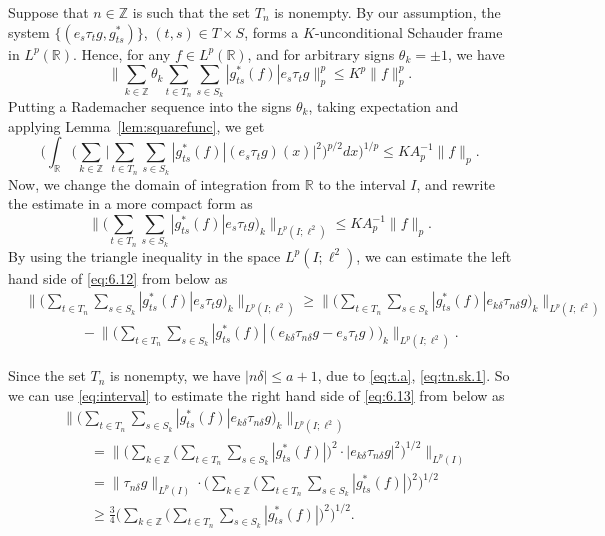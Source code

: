 \documentclass[reqno,a4paper,12pt]{amsart}
\numberwithin{equation}{section}
\numberwithin{figure}{section}
\newcommand\R{\mathbb{R}}
\newcommand\Z{\mathbb{Z}}
\newcommand\1{\mathds{1}}
\newcommand{\TTT}{T}
\newcommand{\SSS}{S}
\newcommand{\ts}{\tau}
\renewcommand\le{\leqslant}
\renewcommand\ge{\geqslant}
\theoremstyle{plain}
\newcommand{\lemref}[1]{Lemma~\ref{#1}}
\theoremstyle{definition}
\begin{document}
Suppose that 
 $n \in \Z$ is such that the set $\TTT_n$ is nonempty.
By our assumption, the system
$\{(e_s \ts_t g, g_{ts}^*)\}$, $(t,s) \in  \TTT \times \SSS$, forms
a $K$-unconditional Schauder frame in $L^p(\R)$.
Hence, for any $f\in L^p(\R)$, 
 and for arbitrary signs $\theta_k = \pm 1$, we have
\begin{equation}
\Big\| \sum_{k\in\Z} \theta_k   \sum_{t\in \TTT_n} \sum_{s\in \SSS_k}
 |g_{ts}^*(f)| e_s \ts_t g \Big\|^p_{p}\le K^p \|f\|^p_p.
\end{equation}
Putting a Rademacher sequence into the signs $\theta_k$, 
taking expectation and applying \lemref{lem:squarefunc}, we get
\begin{equation}
\Big( \int_\R \Big( \sum_{k\in\Z} \Big|  \sum_{t\in \TTT_n} \sum_{s\in \SSS_k}
 |g_{ts}^*(f)|  (e_s \ts_t g)(x)  \Big|^2 \Big)^{p/2} dx \Big)^{1/p}\le K A_p^{-1}  \|f\|_p.
\end{equation}
Now, we change the domain of integration from $\R$ to the interval $I$,
 and rewrite the estimate in a more compact form as
\begin{equation}
\label{eq:6.12}
\Big\| \Big(  \sum_{t\in \TTT_n} \sum_{s\in \SSS_k}
 |g_{ts}^*(f)|e_s \ts_t g \Big)_k \Big\|_{L^p(I;\ell^2)}\le  K A_p^{-1} \|f\|_p.
\end{equation}
By using the triangle inequality in the space $L^p(I;\ell^2)$, 
we can estimate the left hand side of 
\eqref{eq:6.12} from below as 
\begin{align}
&\Big\|   \Big(   \sum_{t\in \TTT_n} \sum_{s\in \SSS_k}
|g_{ts}^*(f)|e_s \ts_t g \Big)_k  \Big\|_{L^p(I;\ell^2)} 
 \ge \Big\| \Big(  \sum_{t\in \TTT_n}  \sum_{s\in \SSS_k}
  |g_{ts}^*(f)|e_{k\delta} \ts_{n\delta}g \Big)_k \Big\|_{L^p(I;\ell^2)} \label{eq:6.13} \\ 
 & \qquad  \qquad  - \Big\| \Big(   \sum_{t\in \TTT_n}  \sum_{s\in \SSS_k} |g_{ts}^*(f)|
   (e_{k\delta} \ts_{n\delta}g -e_s \ts_t g )\Big)_k \Big\|_{L^p(I;\ell^2)}. \label{eq:6.14}
\end{align}

Since the set $\TTT_n$ is nonempty, 
we have $|n\delta| \le a+1$, due to
\eqref{eq:t.a}, \eqref{eq:tn.sk.1}.
So  we can use \eqref{eq:interval} to
estimate the right hand side of \eqref{eq:6.13} from below as
\begin{align}
&\Big\| \Big( \sum_{t\in \TTT_n}  \sum_{s\in \SSS_k}
 |g_{ts}^*(f)|e_{k\delta} \ts_{n\delta}g \Big)_k \Big\|_{L^p(I;\ell^2)}\\
&\qquad = \Big\|\Big(\sum_{k\in\Z} \Big(
\sum_{t\in \TTT_n}  \sum_{s\in \SSS_k}
|g_{ts}^*(f)| \Big)^2 \cdot |e_{k\delta} \ts_{n\delta} g|^2  \Big)^{1/2}\Big\|_{L^p(I)}\\
&\qquad =\| \ts_{n\delta} g\|_{L^p(I)}\cdot\Big( \sum_{k\in\Z} \Big(
\sum_{t\in \TTT_n}  \sum_{s\in \SSS_k}
|g_{ts}^*(f)| \Big)^2 \Big)^{1/2}\\
&\qquad \ge \frac{3}{4}\Big( \sum_{k\in\Z} \Big( 
\sum_{t\in \TTT_n}  \sum_{s\in \SSS_k}
|g_{ts}^*(f)| \Big)^2 \Big)^{1/2}.
\end{align}
\end{document}
